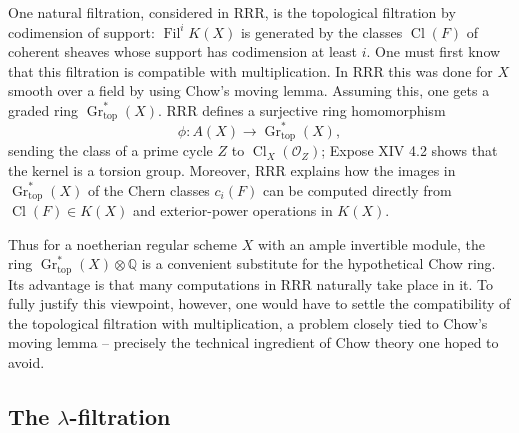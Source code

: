 \documentclass[14pt]{extarticle}
\newcommand{\QQ}{\mathbb Q}
\newcommand{\cO}{\mathcal O}
\newcommand{\Fil}{\operatorname{Fil}}
\newcommand{\Gr}{\operatorname{Gr}}
\newcommand{\Cl}{\operatorname{Cl}}
\begin{document}
One natural filtration, considered in RRR, is the topological filtration by codimension of support: $\Fil^iK(X)$ is generated by the classes $\Cl(F)$ of coherent sheaves whose support has codimension at least $i$. One must first know that this filtration is compatible with multiplication. In RRR this was done for $X$ smooth over a field by using Chow's moving lemma. Assuming this, one gets a graded ring $\Gr^*_{\mathrm{top}}(X)$. RRR defines a surjective ring homomorphism
\[
   \phi:A(X)\to\Gr^*_{\mathrm{top}}(X),
\]
sending the class of a prime cycle $Z$ to $\Cl_X(\cO_Z)$; Expose XIV 4.2 shows that the kernel is a torsion group. Moreover, RRR explains how the images in $\Gr^*_{\mathrm{top}}(X)$ of the Chern classes $c_i(F)$ can be computed directly from $\Cl(F)\in K(X)$ and exterior-power operations in $K(X)$.

Thus for a noetherian regular scheme $X$ with an ample invertible module, the ring $\Gr^*_{\mathrm{top}}(X)\otimes\QQ$ is a convenient substitute for the hypothetical Chow ring. Its advantage is that many computations in RRR naturally take place in it. To fully justify this viewpoint, however, one would have to settle the compatibility of the topological filtration with multiplication, a problem closely tied to Chow's moving lemma -- precisely the technical ingredient of Chow theory one hoped to avoid.

\subsection{The $\lambda$-filtration}
\end{document}
